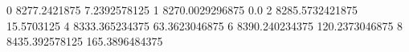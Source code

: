 0 8277.2421875 7.2392578125
1 8270.0029296875 0.0
2 8285.5732421875 15.5703125
4 8333.365234375 63.3623046875
6 8390.240234375 120.2373046875
8 8435.392578125 165.3896484375
